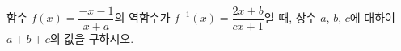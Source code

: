 \hspace*{2mm}\begin{minipage}[t]{\dimexpr\linewidth-2mm\relax}\vspace{0pt}
함수 $f(x)=\dfrac{-x-1}{x+a}$의 역함수가 $f^{-1}(x)=\dfrac{2x+b}{cx+1}$일 때, 상수 $a$, $b$, $c$에 대하여 $a+b+c$의 값을 구하시오.\end{minipage}
